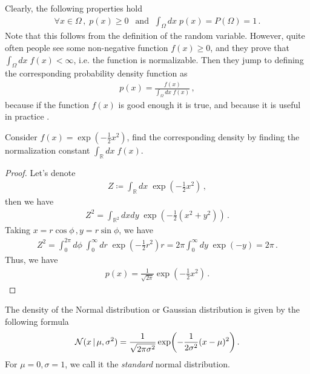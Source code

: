 Clearly, the following properties hold
\begin{align}
    \forall x \in \Omega\,,\; p(x) \geq 0\,\; \text{ and }\; \int_\Omega dx\; p(x) = P(\Omega) = 1\,.
\end{align}
Note that this follows from the definition of the random variable.
However, quite often people see some non-negative function $f(x) \geq 0$, and they prove that $\int_\Omega dx\; f(x) < \infty$, i.e. the function is normalizable. 
Then they jump to defining the corresponding probability density function as
\begin{align}
    p(x) = \frac{f(x)}{\int_\Omega dx\; f(x)}\,,
\end{align}
because if the function $f(x)$ is good enough it is true, and because it is useful in practice .

\begin{example}
    Consider $f(x) = \exp\left(-\frac{1}{2}x^2\right)$, find the corresponding density by finding the normalization constant $\int_{\mathbb{R}} dx\; f(x)$.
\end{example}
\begin{proof}
Let's denote
\begin{align}
    Z \coloneqq \int_{\mathbb{R}} dx\;\exp\left(-\frac{1}{2}x^2\right)\,,
\end{align}
then we have
\begin{align}
     Z^2 = \int_{\mathbb{R}^2} dxdy\;\exp\left(-\frac{1}{2}(x^2+y^2)\right)\,.
\end{align}
Taking $x = r\cos \phi\,, y = r\sin \phi$, we have
\begin{align}
    Z^2 = \int_0^{2\pi}d\phi\;\int_0^\infty dr\;\exp\left(-\frac{1}{2}r^2\right)r = 2\pi \int_0^\infty dy\;\exp\left(-y\right) = 2\pi\,.
\end{align}
Thus, we have
\begin{align}
    p(x) = \frac{1}{\sqrt{2\pi}}\exp\left(-\frac{1}{2}x^2\right)\,.
\end{align}
\end{proof}

\begin{mybox}
\begin{definition}\label{def:normal_pdf}
    The density of the Normal distribution or Gaussian distribution is given by the following formula
    \begin{align}
        \Normal(x\cond \mu, \sigma^2) = \frac{1}{\sqrt{2\pi\sigma^2}}\exp\left(-\frac{1}{2\sigma^2}(x-\mu)^2\right)\,.
    \end{align}
    For $\mu=0,\sigma=1$, we call it the \textit{standard} normal distribution.
\end{definition}
\end{mybox}

